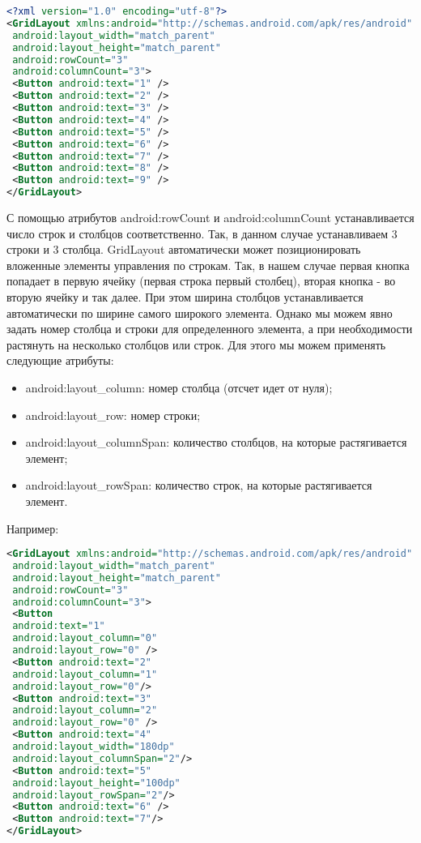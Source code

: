 \begin{lstlisting}[language=xml, caption=\leftline{xml}, label=lst:GridLayout]
<?xml version="1.0" encoding="utf-8"?>
<GridLayout xmlns:android="http://schemas.android.com/apk/res/android"
 android:layout_width="match_parent"
 android:layout_height="match_parent"
 android:rowCount="3"
 android:columnCount="3">
 <Button android:text="1" />
 <Button android:text="2" />
 <Button android:text="3" />
 <Button android:text="4" />
 <Button android:text="5" />
 <Button android:text="6" />
 <Button android:text="7" />
 <Button android:text="8" />
 <Button android:text="9" />
</GridLayout>
\end{lstlisting}
С помощью атрибутов android:rowCount и android:columnCount
устанавливается число строк и столбцов соответственно. Так, в данном
случае устанавливаем 3 строки и 3 столбца. GridLayout автоматически может
позиционировать вложенные элементы управления по строкам. Так, в нашем
случае первая кнопка попадает в первую ячейку (первая строка первый
столбец), вторая кнопка - во вторую ячейку и так далее.
При этом ширина столбцов устанавливается автоматически по ширине
самого широкого элемента.
Однако мы можем явно задать номер столбца и строки для определенного
элемента, а при необходимости растянуть на несколько столбцов или строк.
Для этого мы можем применять следующие атрибуты:
\begin{itemize}
    \item android:layout\_column: номер столбца (отсчет идет от нуля);
    \item android:layout\_row: номер строки;
    \item android:layout\_columnSpan: количество столбцов, на которые
    растягивается элемент;
    \item android:layout_rowSpan: количество строк, на которые растягивается
    элемент.
\end{itemize}
Например:
\begin{lstlisting}[language=xml, caption=\leftline{xml}, label=lst:GridLayoutAtr]
    <GridLayout xmlns:android="http://schemas.android.com/apk/res/android"
 android:layout_width="match_parent"
 android:layout_height="match_parent"
 android:rowCount="3"
 android:columnCount="3">
 <Button
 android:text="1"
 android:layout_column="0"
 android:layout_row="0" />
 <Button android:text="2"
 android:layout_column="1"
 android:layout_row="0"/>
 <Button android:text="3"
 android:layout_column="2"
 android:layout_row="0" />
 <Button android:text="4"
 android:layout_width="180dp"
 android:layout_columnSpan="2"/>
 <Button android:text="5"
 android:layout_height="100dp"
 android:layout_rowSpan="2"/>
 <Button android:text="6" />
 <Button android:text="7"/>
</GridLayout>
\end{lstlisting}
